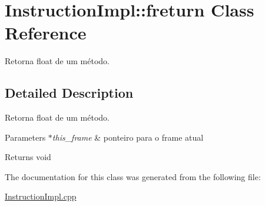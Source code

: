 \hypertarget{class_instruction_impl_1_1freturn}{}\section{Instruction\+Impl\+:\+:freturn Class Reference}
\label{class_instruction_impl_1_1freturn}


Retorna float de um método.  




\subsection{Detailed Description}
Retorna float de um método. 


\begin{DoxyParams}{Parameters}
{\em $\ast$this\+\_\+frame} & ponteiro para o frame atual \\
\hline
\end{DoxyParams}
\begin{DoxyReturn}{Returns}
void 
\end{DoxyReturn}


The documentation for this class was generated from the following file\+:\begin{DoxyCompactItemize}
\item 
\hyperlink{_instruction_impl_8cpp}{Instruction\+Impl.\+cpp}\end{DoxyCompactItemize}
